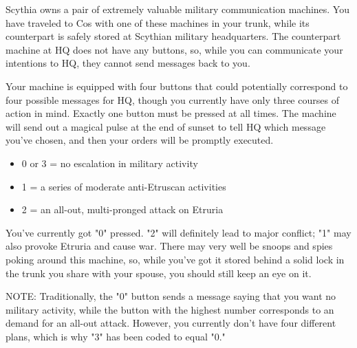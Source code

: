 \documentclass[green]{Kos}
\begin{document}
\name{\gScythiaMachine{}}

Scythia owns a pair of extremely valuable military communication machines. You have traveled to Cos with one of these machines in your trunk, while its counterpart is safely stored at Scythian military headquarters. The counterpart machine at HQ does not have any buttons, so, while you can communicate your intentions to HQ, they cannot send messages back to you. 

Your machine is equipped with four buttons that could potentially correspond to four possible messages for HQ, though you currently have only three courses of action in mind. Exactly one button must be pressed at all times. The machine will send out a magical pulse at the end of sunset to tell HQ which message you've chosen, and then your orders will be promptly executed.

\begin{itemize}
\item 0 or 3 = no escalation in military activity
\item 1 = a series of moderate anti-Etruscan activities
\item 2 = an all-out, multi-pronged attack on Etruria
\end{itemize}

You've currently got "0" pressed. "2" will definitely lead to major conflict; "1" may also provoke Etruria and cause war. There may very well be snoops and spies poking around this machine, so, while you've got it stored behind a solid lock in the trunk you share with your spouse, you should still keep an eye on it.

NOTE: Traditionally, the "0" button sends a message saying that you want no military activity, while the button with the highest number corresponds to an demand for an all-out attack. However, you currently don't have four different plans, which is why "3" has been coded to equal "0."
\end{document}
